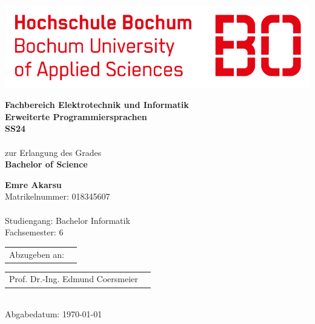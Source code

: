 \setlength\parindent{0cm}


\begin{titlepage}	
\includegraphics[scale = 0.6]{HSBochum-logo.png}

\vspace{2cm}
{
\begin{center}
\LARGE\textbf{Fachbereich Elektrotechnik und Informatik}\\
\vspace{0.3cm}
\textbf{Erweiterte Programmiersprachen}\\
\vspace{0.3cm}
\textbf{SS24}\\
\vspace{1cm}
\LARGE\textit{\grqq }\\
\vspace{1cm}
\large{zur Erlangung des Grades\\}
\textbf{Bachelor of Science}
\end{center}
}

\vspace{3cm}
{
\large\textbf{Emre Akarsu\\}
\normalsize{Matrikelnummer: 018345607}\\
\\
Studiengang: Bachelor Informatik\\
Fachsemester: 6
}

\vspace{3cm}
{
\begin{tabular}{@{}ll}
Abzugeben an:
\end{tabular}
\begin{tabular}{@{}ll}
Prof. Dr.-Ing. Edmund Coersmeier
\end{tabular}
}
\\Abgabedatum: \today
\end{titlepage}

